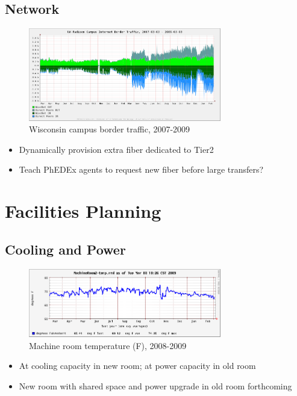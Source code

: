 \documentclass{beamer}
\begin{document}
\subsection{Network}
\begin{frame}
\begin{figure}
    \includegraphics[width=0.75\textwidth]{Graphics/network-all-2yr.png}
    \caption{Wisconsin campus border traffic, 2007-2009}
\end{figure}

\begin{itemize}
    \item Dynamically provision extra fiber dedicated to Tier2
    \item Teach PhEDEx agents to request new fiber before large transfers?
\end{itemize}
\end{frame}

\section{Facilities Planning}
\subsection{Cooling and Power}
\begin{frame}
\begin{figure}
    \includegraphics[width=0.75\textwidth]{Graphics/mr2-temp-1yr.png}
    \caption{Machine room temperature (F), 2008-2009}
\end{figure}

\begin{itemize}
    \item At cooling capacity in new room; at power capacity in old room
    \item New room with shared space and power upgrade in old room forthcoming
\end{itemize}
\end{frame}
\end{document}
